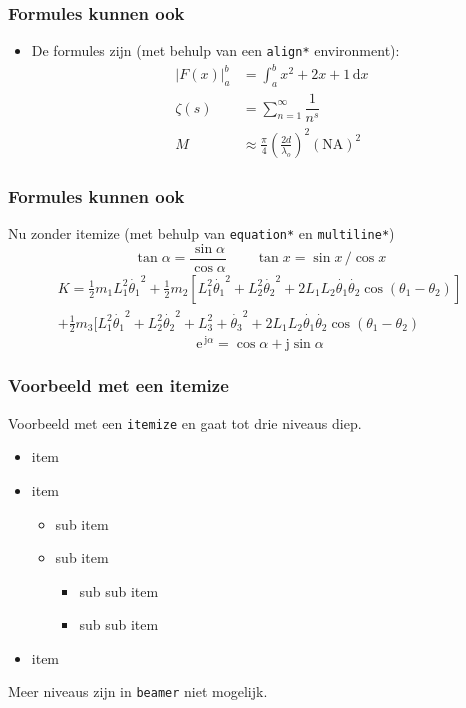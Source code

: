 \documentclass[fleqn,aspectratio=169,dutch,10pt]{beamer}
\begin{document}
\begin{frame}
\frametitle{Formules kunnen ook}
\begin{itemize}
\item De formules zijn (met behulp van een \lstinline|align*| environment):
\begin{align*}
\left|F(x)\right|^b_a &= \int_a^b x^2 + 2x + 1 \, \mathrm{d} x \\
\zeta (s) &= \sum_{n=1}^\infty \dfrac{1}{n^{s}} \\
M&\approx\frac{\pi}{4}\left(\frac{2d}{\lambda_o}\right)^2\left(\mathrm{NA}\right)^2
\end{align*}
\end{itemize}
\end{frame}


\begin{frame}
\frametitle{Formules kunnen ook}
Nu zonder itemize (met behulp van \lstinline|equation*| en \lstinline|multiline*|)
\begin{equation*}
\tan \alpha = \dfrac{\sin \alpha}{\cos \alpha} \qquad \tan x = \sin x \, / \cos x
\end{equation*}%
\begin{multline*}  
K=\displaystyle{\frac{1}{2}m_1 L_1^2 \dot{\theta_1}^2+\frac{1}{2} m_2[L_1^2 \dot{\theta_1}^2+L_2^2 \dot{\theta_2}^2+2 L_1 L_2 \dot{\theta_1}\dot{\theta_2}\cos(\theta_1-\theta_2)]} \\
 \displaystyle{+\frac{1}{2}m_3[L_1^2 \dot{\theta_1}^2+L_2^2 \dot{\theta_2}^2+L_3^2+ \dot{\theta_3}^2+2 L_1 L_2 \dot{\theta_1}\dot{\theta_2}\cos(\theta_1-\theta_2)}
\end{multline*}%
\begin{equation*}
\mathrm{e}^{\, \mathrm{j}\alpha} = \cos \alpha + \mathrm{j} \sin \alpha
\end{equation*}
\end{frame}


\begin{frame}
\frametitle{Voorbeeld met een itemize}
Voorbeeld met een \texttt{itemize} en gaat tot drie niveaus diep.
\begin{itemize}
\item item
\item item
\begin{itemize}
\item sub item
\item sub item
\begin{itemize}
\item sub sub item
\item sub sub item
\end{itemize}
\end{itemize}
\item item
\end{itemize}
Meer niveaus zijn in \lstinline|beamer| niet mogelijk.
\end{frame}
\end{document}

